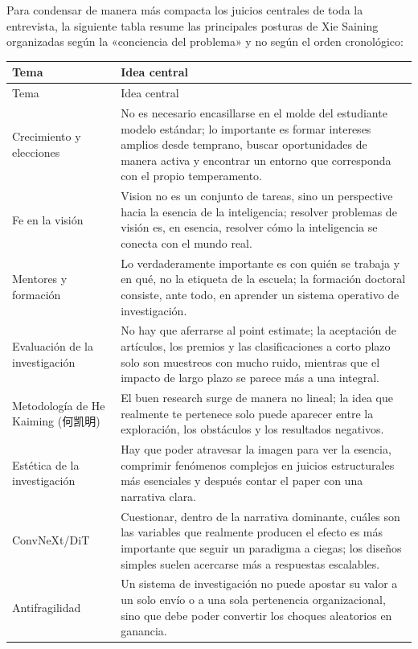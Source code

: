 \documentclass[a4paper,12pt]{article}
\begin{document}
Para condensar de manera más compacta los juicios centrales de toda la entrevista, la siguiente tabla resume las principales posturas de Xie Saining organizadas según la «conciencia del problema» y no según el orden cronológico:

\begin{longtable}{>{\raggedright\arraybackslash}p{} >{\raggedright\arraybackslash}p{}}
\toprule
Tema & Idea central \\
\midrule
\endfirsthead
\toprule
Tema & Idea central \\
\midrule
\endhead
Crecimiento y elecciones & No es necesario encasillarse en el molde del estudiante modelo estándar; lo importante es formar intereses amplios desde temprano, buscar oportunidades de manera activa y encontrar un entorno que corresponda con el propio temperamento. \\
Fe en la visión & Vision no es un conjunto de tareas, sino un perspective hacia la esencia de la inteligencia; resolver problemas de visión es, en esencia, resolver cómo la inteligencia se conecta con el mundo real. \\
Mentores y formación & Lo verdaderamente importante es con quién se trabaja y en qué, no la etiqueta de la escuela; la formación doctoral consiste, ante todo, en aprender un sistema operativo de investigación. \\
Evaluación de la investigación & No hay que aferrarse al point estimate; la aceptación de artículos, los premios y las clasificaciones a corto plazo solo son muestreos con mucho ruido, mientras que el impacto de largo plazo se parece más a una integral. \\
Metodología de He Kaiming (何凯明) & El buen research surge de manera no lineal; la idea que realmente te pertenece solo puede aparecer entre la exploración, los obstáculos y los resultados negativos. \\
Estética de la investigación & Hay que poder atravesar la imagen para ver la esencia, comprimir fenómenos complejos en juicios estructurales más esenciales y después contar el paper con una narrativa clara. \\
ConvNeXt/DiT & Cuestionar, dentro de la narrativa dominante, cuáles son las variables que realmente producen el efecto es más importante que seguir un paradigma a ciegas; los diseños simples suelen acercarse más a respuestas escalables. \\
Antifragilidad & Un sistema de investigación no puede apostar su valor a un solo envío o a una sola pertenencia organizacional, sino que debe poder convertir los choques aleatorios en ganancia. \\

\end{longtable}
\end{document}
